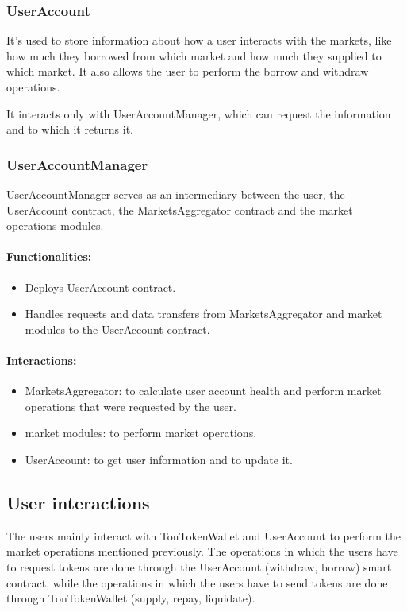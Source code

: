 \subsubsection{UserAccount}

It's used to store information about how a user interacts with the markets, like how much they borrowed from which market and how much they supplied to which market. It also allows the user to perform the borrow and withdraw operations.

It interacts only with UserAccountManager, which can request the information and to which it returns it.

\subsubsection{UserAccountManager}

UserAccountManager serves as an intermediary between the user, the UserAccount contract, the MarketsAggregator contract and the market operations modules.

\paragraph*{Functionalities:}
\begin{itemize}
  \item Deploys UserAccount contract.
  \item Handles requests and data transfers from MarketsAggregator and market modules to the UserAccount contract.
\end{itemize}

\paragraph*{Interactions:}
\begin{itemize}
  \item MarketsAggregator: to calculate user account health and perform market operations that were requested by the user.
  \item market modules: to perform market operations.
  \item UserAccount: to get user information and to update it.
\end{itemize}

\subsection{User interactions}

The users mainly interact with TonTokenWallet and UserAccount to perform the market operations mentioned previously. The operations in which the users have to request tokens are done through the UserAccount (withdraw, borrow) smart contract, while the operations in which the users have to send tokens are done through TonTokenWallet (supply, repay, liquidate). %

